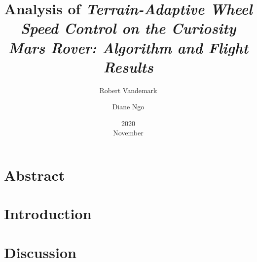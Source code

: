 \documentclass[11pt]{report}
\title{Analysis of \em{Terrain-Adaptive Wheel Speed Control on the Curiosity Mars Rover: Algorithm and Flight Results}}
\date{2020\\ November}
\author{Robert Vandemark \and Diane Ngo}
\begin{document}
	\renewcommand*{\thepage}{\arabic{page}}
	\setcounter{page}{1}
	\maketitle

	\tableofcontents
	\newpage

	\acresetall
	\chapter{Abstract}
	

	\acresetall
	\chapter{Introduction}
	

	\chapter{Discussion}
	

	\begin{center}
		\printbibliography[heading=bibintoc, title={Bibliography}]
	\end{center}
\end{document}
